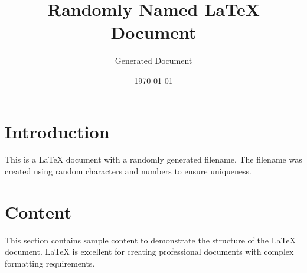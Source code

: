 \documentclass{article}
\title{Randomly Named LaTeX Document}
\author{Generated Document}
\date{\today}
\begin{document}
\maketitle

\section{Introduction}
This is a LaTeX document with a randomly generated filename. The filename was created using random characters and numbers to ensure uniqueness.

\section{Content}
This section contains sample content to demonstrate the structure of the LaTeX document. LaTeX is excellent for creating professional documents with complex formatting requirements.
\end{document}
